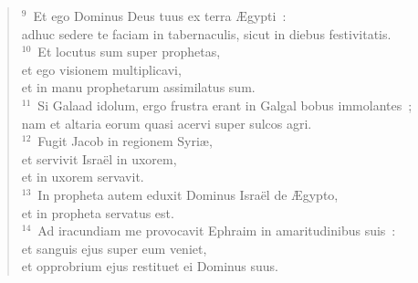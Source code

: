 \begin{flushleft}
\begin{verse}
${}^{9}$~Et ego Dominus Deus tuus ex terra \AE gypti~:\\ adhuc sedere te faciam in tabernaculis, sicut in diebus festivitatis.\\
${}^{10}$~Et locutus sum super prophetas,\\ et ego visionem multiplicavi,\\ et in manu prophetarum assimilatus sum.\\
${}^{11}$~Si Galaad idolum, ergo frustra erant in Galgal bobus immolantes~;\\ nam et altaria eorum quasi acervi super sulcos agri.\\
${}^{12}$~Fugit Jacob in regionem Syri\ae ,\\ et servivit Isra\"el in uxorem,\\ et in uxorem servavit.\\
${}^{13}$~In propheta autem eduxit Dominus Isra\"el de \AE gypto,\\ et in propheta servatus est.\\
${}^{14}$~Ad iracundiam me provocavit Ephraim in amaritudinibus suis~:\\ et sanguis ejus super eum veniet,\\ et opprobrium ejus restituet ei Dominus suus.\end{verse}\end{flushleft}



